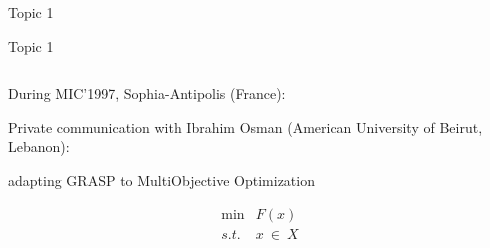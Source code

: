 \documentclass[10pt,xcolor=dvipsnames]{beamer}
\begin{document}

\begin{frame}[standout]

Topic 1

\end{frame}

\begin{frame}{Topic 1}
\vspace{2mm}

\begin{columns}
\begin{column}{0.425\textwidth}
During MIC'1997, Sophia-Antipolis (France):
\vspace{4mm}

Private communication with Ibrahim Osman (American University of Beirut, Lebanon): 
\vspace{1mm}

\color{blue}adapting GRASP to MultiObjective Optimization\color{black}\\
\vspace{-2mm}

{\small 
\[
\begin{array}{clrclrrrl}
\min   & F(x)   \\
s.t.     & x  \ \in \ X
\end{array}
\]


}
\end{column}
\end{columns}
\end{frame}
\end{document}
